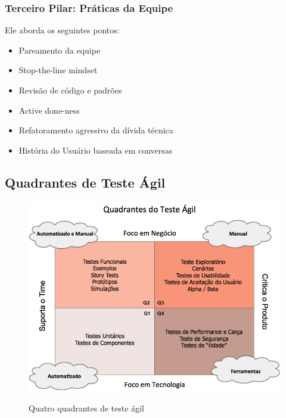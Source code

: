 \documentclass[
	12pt,				%
	openright,			%
	oneside,			%
	a4paper,			%
	english,			%
	brazil,				%
	]{abntex2}
\begin{document}
\subsubsection{Terceiro Pilar: Práticas da Equipe}
Ele aborda os seguintes pontos:
\begin{itemize}
    \item Pareamento da equipe
    \item Stop-the-line mindset %
    \item Revisão de código e padrões
    \item Active done-ness %
    \item Refatoramento agressivo da dívida técnica
    \item História do Usuário baseada em conversas
\end{itemize}

\subsection{Quadrantes de Teste Ágil}
\label{quatro-quadrantes}

\begin{figure}[H]
    \centering
    \caption{Quatro quadrantes de teste ágil}
    \graphicspath{ {./graphics/agile/} }
    \includegraphics[scale=0.6]{Quadrante-Teste-Agil}
    \label{fig:quatro-quadrantes}
\end{figure}
\end{document}
